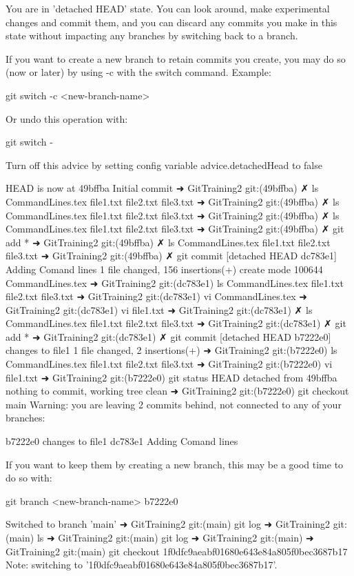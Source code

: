 You are in 'detached HEAD' state. You can look around, make experimental
changes and commit them, and you can discard any commits you make in this
state without impacting any branches by switching back to a branch.

If you want to create a new branch to retain commits you create, you may
do so (now or later) by using -c with the switch command. Example:

  git switch -c <new-branch-name>

Or undo this operation with:

  git switch -

Turn off this advice by setting config variable advice.detachedHead to false

HEAD is now at 49bffba Initial commit
➜  GitTraining2 git:(49bffba) ✗ ls
CommandLines.tex file1.txt        file2.txt        file3.txt
➜  GitTraining2 git:(49bffba) ✗ ls
CommandLines.tex file1.txt        file2.txt        file3.txt
➜  GitTraining2 git:(49bffba) ✗ ls
CommandLines.tex file1.txt        file2.txt        file3.txt
➜  GitTraining2 git:(49bffba) ✗ git add *                       
➜  GitTraining2 git:(49bffba) ✗ ls
CommandLines.tex file1.txt        file2.txt        file3.txt
➜  GitTraining2 git:(49bffba) ✗ git commit
[detached HEAD dc783e1] Adding Comand lines
 1 file changed, 156 insertions(+)
 create mode 100644 CommandLines.tex
➜  GitTraining2 git:(dc783e1) ls
CommandLines.tex file1.txt        file2.txt        file3.txt
➜  GitTraining2 git:(dc783e1) vi CommandLines.tex 
➜  GitTraining2 git:(dc783e1) vi file1.txt 
➜  GitTraining2 git:(dc783e1) ✗ ls
CommandLines.tex file1.txt        file2.txt        file3.txt
➜  GitTraining2 git:(dc783e1) ✗ git add *
➜  GitTraining2 git:(dc783e1) ✗ git commit
[detached HEAD b7222e0] changes to file1
 1 file changed, 2 insertions(+)
➜  GitTraining2 git:(b7222e0) ls
CommandLines.tex file1.txt        file2.txt        file3.txt
➜  GitTraining2 git:(b7222e0) vi file1.txt       
➜  GitTraining2 git:(b7222e0) git status
HEAD detached from 49bffba
nothing to commit, working tree clean
➜  GitTraining2 git:(b7222e0) git checkout main
Warning: you are leaving 2 commits behind, not connected to
any of your branches:

  b7222e0 changes to file1
  dc783e1 Adding Comand lines

If you want to keep them by creating a new branch, this may be a good time
to do so with:

 git branch <new-branch-name> b7222e0

Switched to branch 'main'
➜  GitTraining2 git:(main) git log
➜  GitTraining2 git:(main) ls
➜  GitTraining2 git:(main) git log
➜  GitTraining2 git:(main) 
➜  GitTraining2 git:(main) git checkout 1f0dfc9aeabf01680e643e84a805f0bec3687b17
Note: switching to '1f0dfc9aeabf01680e643e84a805f0bec3687b17'.

